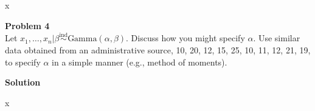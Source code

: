 \documentclass{article}
\newcommand{\ut}[1]{\underaccent{\tilde}{#1}}
\renewcommand{\vec}[1]{\ut{#1}}
\newcommand{\ind}{\stackrel{\text{ind}}{\sim}}
\newcommand{\nx}{x_1,\dots,x_n}
\newcommand{\ny}{y_1,\dots,y_n}
\newcommand{\Done}[2]{\text{#1}\left({#2}\right)}
\newcommand{\Dtwo}[3]{\text{#1}\left({#2},{#3}\right)}
\begin{document}
x

\vspace{\baselineskip}
\noindent
\Large{\textbf{Problem 4}}\normalsize
\\

Let $\nx | \beta \ind \Dtwo{Gamma}{\alpha}{\beta}$. Discuss how you might specify $\alpha$. Use similar data obtained from an administrative source, 10, 20, 12, 15, 25, 10, 11, 12, 21, 19, to specify $\alpha$ in a simple manner (e.g., method of moments).


\vspace{\baselineskip}
\noindent
\textbf{Solution}

x







\end{document}
